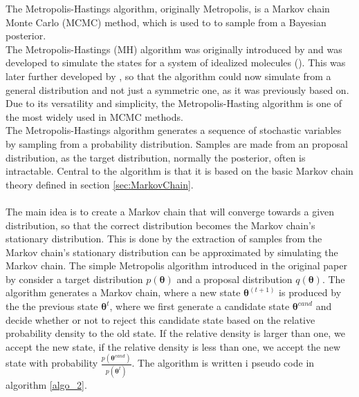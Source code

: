 The Metropolis-Hastings algorithm, originally Metropolis, is a Markov chain Monte Carlo (MCMC) method, which is used to to sample from a Bayesian posterior. \\
The Metropolis-Hastings (MH) algorithm was originally introduced by \cite{Metropolis1953} and was developed to simulate the states for a system of idealized molecules (\cite{neal2012mcmc}). This was later further developed by \cite{hastings70}, so that the algorithm could now simulate from a general distribution and not just a symmetric one, as it was previously based on. Due to its versatility and simplicity, the Metropolis-Hasting algorithm is one of the most widely used in MCMC methods.
\\
The Metropolis-Hastings algorithm generates a sequence of stochastic variables by sampling from a probability distribution. Samples are made from an proposal distribution, as the target distribution, normally the posterior, often is intractable. Central to the algorithm is that it is based on the basic Markov chain theory defined in section \ref{sec:MarkovChain}.\\
\\
The main idea is to create a Markov chain that will converge towards a given distribution, so that the correct distribution becomes the Markov chain's stationary distribution. This is done by the extraction of samples from the Markov chain's stationary distribution can be approximated by simulating the Markov chain. The simple Metropolis algorithm introduced in the original paper by \cite{Metropolis1953} consider a target distribution $p(\boldsymbol{\theta})$ and a proposal distribution $q(\boldsymbol{\theta})$. The algorithm generates a Markov chain, where a new state $\boldsymbol{\theta}^{(t+1)}$ is produced by the the previous state $\boldsymbol{\theta}^t$, where we first generate a candidate state $\boldsymbol{\theta}^{cand}$ and decide whether or not to reject this candidate state based on the relative probability density to the old state. If the relative density is larger than one, we accept the new state, if the relative density is less than one, we accept the new state with probability $\frac{p(\boldsymbol{\theta}^{cand})}{p(\boldsymbol{\theta}^{t})}$. The algorithm is written i pseudo code in algorithm \ref{algo_2}.

